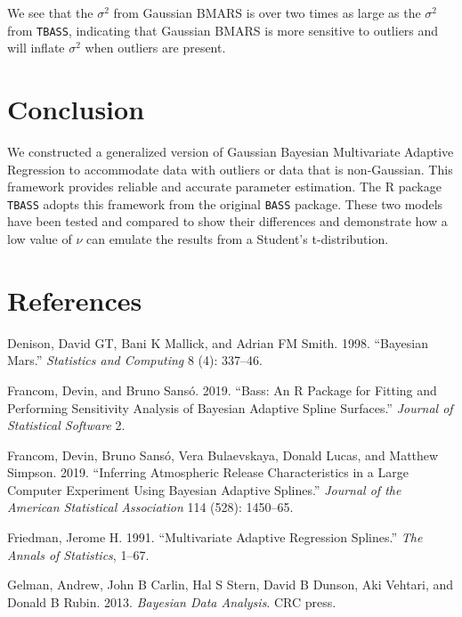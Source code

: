\documentclass[
]{article}
\begin{document}
We see that the \(\sigma^2\) from Gaussian BMARS is over two times as
large as the \(\sigma^2\) from \texttt{TBASS}, indicating that Gaussian
BMARS is more sensitive to outliers and will inflate \(\sigma^2\) when
outliers are present.

\hypertarget{conclusion}{%
\section{Conclusion}\label{conclusion}}

We constructed a generalized version of Gaussian Bayesian Multivariate
Adaptive Regression to accommodate data with outliers or data that is
non-Gaussian. This framework provides reliable and accurate parameter
estimation. The R package \texttt{TBASS} adopts this framework from the
original \texttt{BASS} package. These two models have been tested and
compared to show their differences and demonstrate how a low value of
\(\nu\) can emulate the results from a Student's t-distribution.

\hypertarget{references}{%
\section*{References}\label{references}}

\hypertarget{refs}{}
\leavevmode\hypertarget{ref-denison1998bayesian}{}%
Denison, David GT, Bani K Mallick, and Adrian FM Smith. 1998. ``Bayesian
Mars.'' \emph{Statistics and Computing} 8 (4): 337--46.

\leavevmode\hypertarget{ref-francom2019bass}{}%
Francom, Devin, and Bruno Sansó. 2019. ``Bass: An R Package for Fitting
and Performing Sensitivity Analysis of Bayesian Adaptive Spline
Surfaces.'' \emph{Journal of Statistical Software} 2.

\leavevmode\hypertarget{ref-francom2019inferring}{}%
Francom, Devin, Bruno Sansó, Vera Bulaevskaya, Donald Lucas, and Matthew
Simpson. 2019. ``Inferring Atmospheric Release Characteristics in a
Large Computer Experiment Using Bayesian Adaptive Splines.''
\emph{Journal of the American Statistical Association} 114 (528):
1450--65.

\leavevmode\hypertarget{ref-friedman1991multivariate}{}%
Friedman, Jerome H. 1991. ``Multivariate Adaptive Regression Splines.''
\emph{The Annals of Statistics}, 1--67.

\leavevmode\hypertarget{ref-gelman2013bayesian}{}%
Gelman, Andrew, John B Carlin, Hal S Stern, David B Dunson, Aki Vehtari,
and Donald B Rubin. 2013. \emph{Bayesian Data Analysis}. CRC press.
\end{document}
